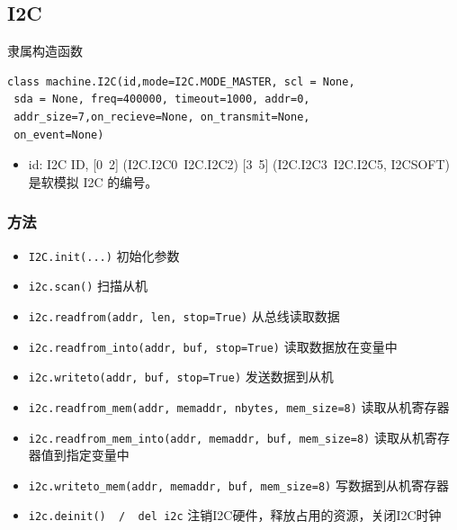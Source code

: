 \documentclass[UTF8]{ctexart}
\begin{document}
    \subsection{I2C}
    隶属构造函数
    \begin{lstlisting}
class machine.I2C(id,mode=I2C.MODE_MASTER, scl = None,
 sda = None, freq=400000, timeout=1000, addr=0,
 addr_size=7,on_recieve=None, on_transmit=None, 
 on_event=None)
    \end{lstlisting}
    \begin{itemize}
    	\item \colorbox{mygrey}{\color{red}id}: I2C ID, [0~2] (I2C.I2C0~I2C.I2C2) [3~5] (I2C.I2C3~I2C.I2C5, I2C\textunderscore SOFT) 是软模拟 I2C 的编号。
    \end{itemize}
    \subsubsection{方法}
    \begin{itemize}
    	\item \verb|I2C.init(...)|  初始化参数
    	\item \lstinline|i2c.scan()|   扫描从机
    	\item \lstinline|i2c.readfrom(addr, len, stop=True)|       从总线读取数据
    	\item \lstinline|i2c.readfrom_into(addr, buf, stop=True)|   读取数据放在变量中
    	\item \lstinline|i2c.writeto(addr, buf, stop=True)|   发送数据到从机
    	\item \lstinline|i2c.readfrom_mem(addr, memaddr, nbytes, mem_size=8)|    读取从机寄存器
    	\item \lstinline|i2c.readfrom_mem_into(addr, memaddr, buf, mem_size=8)|     读取从机寄存器值到指定变量中
    	\item \lstinline|i2c.writeto_mem(addr, memaddr, buf, mem_size=8)|        写数据到从机寄存器
    	\item \lstinline|i2c.deinit()  /  del i2c| 注销I2C硬件，释放占用的资源，关闭I2C时钟
    \end{itemize}
\end{document}
